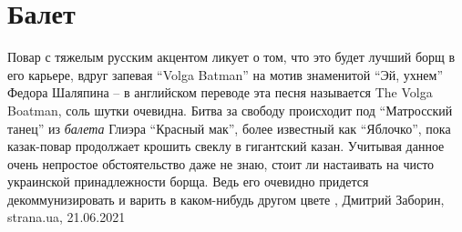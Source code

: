  
 
 
 
 
\chapter{Балет}

Повар с тяжелым русским акцентом ликует о том, что это будет лучший борщ в его
карьере, вдруг запевая \enquote{Volga Batman} на мотив знаменитой \enquote{Эй, ухнем} Федора
Шаляпина – в английском переводе эта песня называется The Volga Boatman, соль
шутки очевидна. Битва за свободу происходит под \enquote{Матросский танец} из \emph{балета}
Глиэра \enquote{Красный мак}, более известный как \enquote{Яблочко}, пока казак-повар
продолжает крошить свеклу в гигантский казан.  Учитывая данное очень непростое
обстоятельство даже не знаю, стоит ли настаивать на чисто украинской
принадлежности борща. Ведь его очевидно придется декоммунизировать и варить в
каком-нибудь другом цвете
, 
Дмитрий Заборин, strana.ua, 21.06.2021

